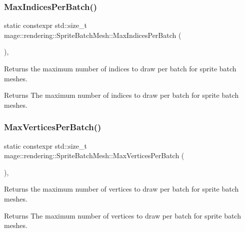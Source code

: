 \subsubsection{\texorpdfstring{Max\+Indices\+Per\+Batch()}{MaxIndicesPerBatch()}}
{\footnotesize\ttfamily static constexpr std\+::size\+\_\+t mage\+::rendering\+::\+Sprite\+Batch\+Mesh\+::\+Max\+Indices\+Per\+Batch (\begin{DoxyParamCaption}{ }\end{DoxyParamCaption})\hspace{0.3cm}{\ttfamily [static]}, {\ttfamily [noexcept]}}

Returns the maximum number of indices to draw per batch for sprite batch meshes.

\begin{DoxyReturn}{Returns}
The maximum number of indices to draw per batch for sprite batch meshes. 
\end{DoxyReturn}
\mbox{\label{classmage_1_1rendering_1_1_sprite_batch_mesh_ac568847d5fb99704ab6c494990df6d59}} 
\subsubsection{\texorpdfstring{Max\+Vertices\+Per\+Batch()}{MaxVerticesPerBatch()}}
{\footnotesize\ttfamily static constexpr std\+::size\+\_\+t mage\+::rendering\+::\+Sprite\+Batch\+Mesh\+::\+Max\+Vertices\+Per\+Batch (\begin{DoxyParamCaption}{ }\end{DoxyParamCaption})\hspace{0.3cm}{\ttfamily [static]}, {\ttfamily [noexcept]}}

Returns the maximum number of vertices to draw per batch for sprite batch meshes.

\begin{DoxyReturn}{Returns}
The maximum number of vertices to draw per batch for sprite batch meshes. 
\end{DoxyReturn}
\mbox{\label{classmage_1_1rendering_1_1_sprite_batch_mesh_a58511e130cddfc6e19d551a0416f3111}} 
